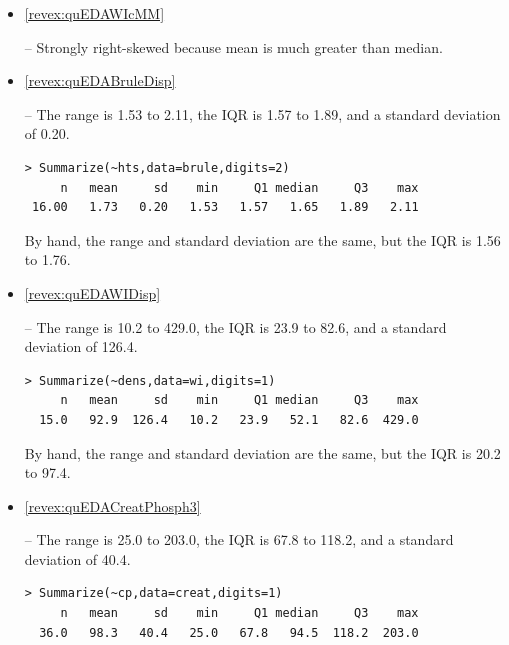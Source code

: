 \documentclass[10pt,openany]{book}\usepackage[]{graphicx}\usepackage[]{color}
\makeatletter
\newenvironment{kframe}{%
 \def\at@end@of@kframe{}%
 \ifinner\ifhmode%
  \def\at@end@of@kframe{\end{minipage}}%
  \begin{minipage}{\columnwidth}%
 \fi\fi%
 \def\FrameCommand##1{\hskip\@totalleftmargin \hskip-\fboxsep
 \colorbox{shadecolor}{##1}\hskip-\fboxsep
     \hskip-\linewidth \hskip-\@totalleftmargin \hskip\columnwidth}%
 \MakeFramed {\advance\hsize-\width
   \@totalleftmargin\z@ \linewidth\hsize
   \@setminipage}}%
 {\par\unskip\endMakeFramed%
 \at@end@of@kframe}
\newenvironment{knitrout}{}{} %
\makeatother
\begin{document}
\begin{itemize}
  \item \hypertarget{ans:quEDAWIcMM}{\ref{revex:quEDAWIcMM}} --  Strongly right-skewed because mean is much greater than median.

  \item \hypertarget{ans:quEDABruleDisp}{\ref{revex:quEDABruleDisp}} -- The range is 1.53 to 2.11, the IQR is 1.57 to 1.89, and a standard deviation of 0.20.
\begin{knitrout}
\color{fgcolor}\begin{kframe}
\begin{verbatim}
> Summarize(~hts,data=brule,digits=2)
     n   mean     sd    min     Q1 median     Q3    max 
 16.00   1.73   0.20   1.53   1.57   1.65   1.89   2.11 
\end{verbatim}
\end{kframe}
\end{knitrout}

\noindent By hand, the range and standard deviation are the same, but the IQR is 1.56 to 1.76.

  \item \hypertarget{ans:quEDAWIDisp}{\ref{revex:quEDAWIDisp}} -- The range is 10.2 to 429.0, the IQR is 23.9 to 82.6, and a standard deviation of 126.4.
\begin{knitrout}
\color{fgcolor}\begin{kframe}
\begin{verbatim}
> Summarize(~dens,data=wi,digits=1)
     n   mean     sd    min     Q1 median     Q3    max 
  15.0   92.9  126.4   10.2   23.9   52.1   82.6  429.0 
\end{verbatim}
\end{kframe}
\end{knitrout}

\noindent By hand, the range and standard deviation are the same, but the IQR is 20.2 to 97.4.

  \item \hypertarget{ans:quEDACreatPhosph3}{\ref{revex:quEDACreatPhosph3}} -- The range is 25.0 to 203.0, the IQR is 67.8 to 118.2, and a standard deviation of 40.4.
\begin{knitrout}
\color{fgcolor}\begin{kframe}
\begin{verbatim}
> Summarize(~cp,data=creat,digits=1)
     n   mean     sd    min     Q1 median     Q3    max 
  36.0   98.3   40.4   25.0   67.8   94.5  118.2  203.0 
\end{verbatim}
\end{kframe}
\end{knitrout}


\end{itemize}
\end{document}

